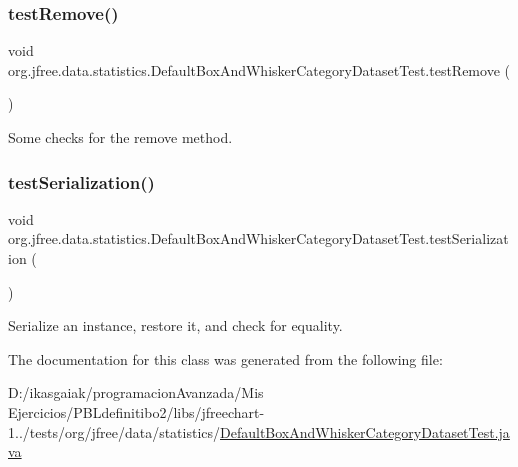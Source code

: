 \subsubsection{\texorpdfstring{test\+Remove()}{testRemove()}}
{\footnotesize\ttfamily void org.\+jfree.\+data.\+statistics.\+Default\+Box\+And\+Whisker\+Category\+Dataset\+Test.\+test\+Remove (\begin{DoxyParamCaption}{ }\end{DoxyParamCaption})}

Some checks for the remove method. \mbox{\label{classorg_1_1jfree_1_1data_1_1statistics_1_1_default_box_and_whisker_category_dataset_test_ac94214e34adcbf54a15cd53a58971d4c}} 
\subsubsection{\texorpdfstring{test\+Serialization()}{testSerialization()}}
{\footnotesize\ttfamily void org.\+jfree.\+data.\+statistics.\+Default\+Box\+And\+Whisker\+Category\+Dataset\+Test.\+test\+Serialization (\begin{DoxyParamCaption}{ }\end{DoxyParamCaption})}

Serialize an instance, restore it, and check for equality. 

The documentation for this class was generated from the following file\+:\begin{DoxyCompactItemize}
\item 
D\+:/ikasgaiak/programacion\+Avanzada/\+Mis Ejercicios/\+P\+B\+Ldefinitibo2/libs/jfreechart-\/1../tests/org/jfree/data/statistics/\mbox{\hyperlink{_default_box_and_whisker_category_dataset_test_8java}{Default\+Box\+And\+Whisker\+Category\+Dataset\+Test.\+java}}\end{DoxyCompactItemize}
